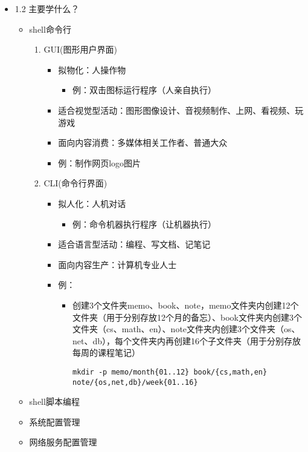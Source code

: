 \documentclass[bigger]{beamer}
\begin{document}
\begin{frame}[fragile]
\begin{itemize}
\item 1.2 主要学什么？
\label{sec-1-1-2}%
\begin{itemize}
\item shell命令行
\begin{enumerate}
\item GUI(图形用户界面)
\begin{itemize}
\item 拟物化：人操作物
\begin{itemize}
\item 例：双击图标运行程序（人亲自执行）
\end{itemize}
\item 适合视觉型活动：图形图像设计、音视频制作、上网、看视频、玩游戏
\item 面向内容消费：多媒体相关工作者、普通大众
\item 例：制作网页logo图片
\end{itemize}
\item CLI(命令行界面)
\begin{itemize}
\item 拟人化：人机对话
\begin{itemize}
\item 例：命令机器执行程序（让机器执行）
\end{itemize}
\item 适合语言型活动：编程、写文档、记笔记
\item 面向内容生产：计算机专业人士
\item 例：
\begin{itemize}
\item 创建3个文件夹memo、book、note，memo文件夹内创建12个文件夹（用于分别存放12个月的备忘）、book文件夹内创建3个文件夹（cs、math、en）、note文件夹内创建3个文件夹（os、net、db），每个文件夹内再创建16个子文件夹（用于分别存放每周的课程笔记）

\begin{verbatim}
mkdir -p memo/month{01..12} book/{cs,math,en} note/{os,net,db}/week{01..16}
\end{verbatim}
\end{itemize}
\end{itemize}
\end{enumerate}
\item shell脚本编程
\item 系统配置管理
\item 网络服务配置管理
\end{itemize}


\end{itemize}
\end{frame}
\end{document}
